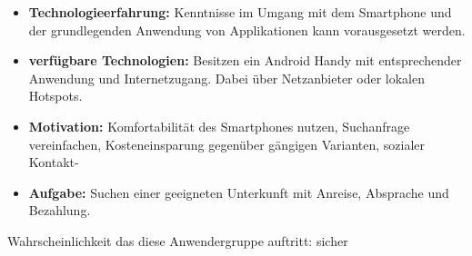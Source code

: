 \begin{itemize}
   \item
   \textbf{Technologieerfahrung:} Kenntnisse im Umgang mit dem Smartphone und der grundlegenden Anwendung von Applikationen kann vorausgesetzt werden.

   \item
  \textbf{verfügbare Technologien:} Besitzen ein Android Handy mit entsprechender Anwendung und Internetzugang. Dabei über Netzanbieter oder lokalen Hotspots.

   \item
   \textbf{Motivation:} Komfortabilität des Smartphones nutzen, Suchanfrage vereinfachen, Kosteneinsparung gegenüber gängigen Varianten, sozialer Kontakt-

   \item
   \textbf{Aufgabe:} Suchen einer geeigneten Unterkunft mit Anreise, Absprache und Bezahlung.
   
\end{itemize}
Wahrscheinlichkeit das diese Anwendergruppe auftritt: sicher


\newpage

